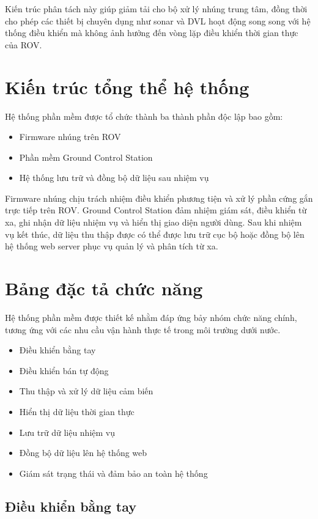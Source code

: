 \documentclass[../DoAn.tex]{subfiles}
\begin{document}
Kiến trúc phân tách này giúp giảm tải cho bộ xử lý nhúng trung tâm, đồng thời cho phép các thiết bị chuyên dụng như sonar và DVL hoạt động song song với hệ thống điều khiển mà không ảnh hưởng đến vòng lặp điều khiển thời gian thực của ROV.

\section{Kiến trúc tổng thể hệ thống}

Hệ thống phần mềm được tổ chức thành ba thành phần độc lập bao gồm:

\begin{itemize}
\item Firmware nhúng trên ROV
\item Phần mềm Ground Control Station
\item Hệ thống lưu trữ và đồng bộ dữ liệu sau nhiệm vụ
\end{itemize}

Firmware nhúng chịu trách nhiệm điều khiển phương tiện và xử lý phần cứng
gắn trực tiếp trên ROV. Ground Control Station đảm nhiệm giám sát, điều
khiển từ xa, ghi nhận dữ liệu nhiệm vụ và hiển thị giao diện người dùng.
Sau khi nhiệm vụ kết thúc, dữ liệu thu thập được có thể được lưu trữ cục
bộ hoặc đồng bộ lên hệ thống web server phục vụ quản lý và phân tích từ xa.

\section{Bảng đặc tả chức năng}

Hệ thống phần mềm được thiết kế nhằm đáp ứng bảy nhóm chức năng chính,
tương ứng với các nhu cầu vận hành thực tế trong môi trường dưới nước.

\begin{itemize}
\item Điều khiển bằng tay
\item Điều khiển bán tự động
\item Thu thập và xử lý dữ liệu cảm biến
\item Hiển thị dữ liệu thời gian thực
\item Lưu trữ dữ liệu nhiệm vụ
\item Đồng bộ dữ liệu lên hệ thống web
\item Giám sát trạng thái và đảm bảo an toàn hệ thống
\end{itemize}

\subsection{Điều khiển bằng tay}
\end{document}
